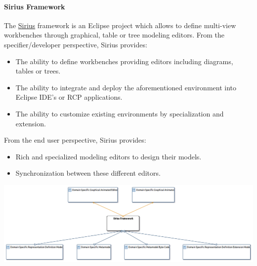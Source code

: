 \documentclass{gemoc} %
\begin{document}
\paragraph{Sirius Framework}
\label{sec:Sirius_Framework}

The \href{http://www.eclipse.org/proposals/modeling.sirius/}{Sirius} framework is an Eclipse project which allows to define multi-view workbenches through graphical, table or tree modeling editors.
From the specifier/developer perspective, Sirius provides:
\begin{itemize}
\item The ability to define workbenches providing editors including diagrams, tables or trees.
\item The ability to integrate and deploy the aforementioned environment into Eclipse IDE's or RCP applications.
\item The ability to customize existing environments by specialization and extension.
\end{itemize}
From the end user perspective, Sirius provides:
\begin{itemize}
\item Rich and specialized modeling editors to design their models.
\item Synchronization between these different editors.
\end{itemize}
\begin{center}
\includegraphics*[trim=0.0cm 0.0cm 0cm 0.0cm, clip=true]{../images/generated/Generated_Sirius_Framework.png}
\end{center}
\end{document}

